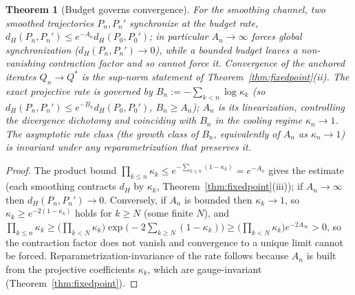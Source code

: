 \documentclass[11pt]{article}
\theoremstyle{plain}
\newtheorem{theorem}{Theorem}[section]
\theoremstyle{definition}
\theoremstyle{remark}
\begin{document}
\begin{theorem}[Budget governs convergence]\label{thm:budget}
For the smoothing channel, two smoothed trajectories $P_n,P_n'$ synchronize at the budget rate, $d_H(P_n,P_n')\le e^{-A_n}d_H(P_0,P_0')$; in particular $A_n\to\infty$ forces global synchronization ($d_H(P_n,P_n')\to0$), while a bounded budget leaves a non-vanishing contraction factor and so cannot force it. Convergence of the anchored iterates $Q_n\to Q^*$ is the sup-norm statement of Theorem~\ref{thm:fixedpoint}(ii). The exact projective rate is governed by $B_n:=-\sum_{k<n}\log\kappa_k$ (so $d_H(P_n,P_n')\le e^{-B_n}d_H(P_0,P_0')$, $B_n\ge A_n$); $A_n$ is its linearization, controlling the divergence dichotomy and coinciding with $B_n$ in the cooling regime $\kappa_n\to1$. The asymptotic rate class (the growth class of $B_n$, equivalently of $A_n$ as $\kappa_n\to1$) is invariant under any reparametrization that preserves it.
\end{theorem}
\begin{proof}
The product bound $\prod_{k\le n}\kappa_k\le e^{-\sum_{k\le n}(1-\kappa_k)}=e^{-A_n}$ gives the estimate (each smoothing contracts $d_H$ by $\kappa_k$, Theorem~\ref{thm:fixedpoint}(iii)); if $A_n\to\infty$ then $d_H(P_n,P_n')\to0$. Conversely, if $A_n$ is bounded then $\kappa_k\to1$, so $\kappa_k\ge e^{-2(1-\kappa_k)}$ holds for $k\ge N$ (some finite $N$), and $\prod_{k\le n}\kappa_k\ge\big(\prod_{k<N}\kappa_k\big)\exp\!\big(-2\textstyle\sum_{k\ge N}(1-\kappa_k)\big)\ge\big(\prod_{k<N}\kappa_k\big)e^{-2A_\infty}>0$, so the contraction factor does not vanish and convergence to a unique limit cannot be forced. Reparametrization-invariance of the rate follows because $A_n$ is built from the projective coefficients $\kappa_k$, which are gauge-invariant (Theorem~\ref{thm:fixedpoint}).
\end{proof}
\end{document}
